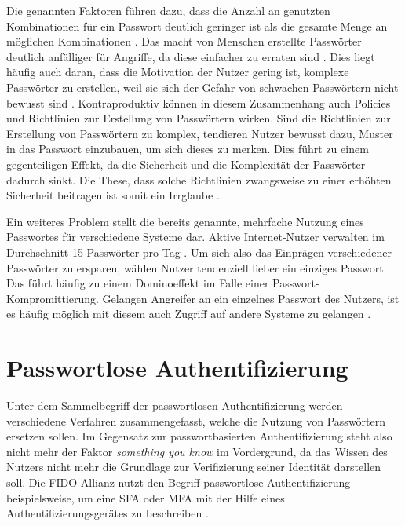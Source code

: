 Die genannten Faktoren führen dazu, dass die Anzahl an genutzten Kombinationen für ein Passwort deutlich geringer ist als die gesamte Menge an möglichen Kombinationen \cite{boonkrong2012security}. Das macht von Menschen erstellte Passwörter deutlich anfälliger für Angriffe, da diese einfacher zu erraten sind \cite{chanda2016password}. Dies liegt häufig auch daran, dass die Motivation der Nutzer gering ist, komplexe Passwörter zu erstellen, weil sie sich der Gefahr von schwachen Passwörtern nicht bewusst sind \cite{yildirim2019encouraging}. Kontraproduktiv können in diesem Zusammenhang auch Policies und Richtlinien zur Erstellung von Passwörtern \cite{yildirim2019encouraging} wirken. Sind die Richtlinien zur Erstellung von Passwörtern zu komplex, tendieren Nutzer bewusst dazu, Muster in das Passwort einzubauen, um sich dieses zu merken. Dies führt zu einem gegenteiligen Effekt, da die Sicherheit und die Komplexität der Passwörter dadurch sinkt. Die These, dass solche Richtlinien zwangsweise zu einer erhöhten Sicherheit beitragen ist somit ein Irrglaube \cite{yildirim2019encouraging} \cite{morii2017research}.

Ein weiteres Problem stellt die bereits genannte, mehrfache Nutzung eines Passwortes für verschiedene Systeme dar. 
Aktive Internet-Nutzer verwalten im Durchschnitt 15 Passwörter pro Tag \cite{ives2004domino}. 
Um sich also das Einprägen verschiedener Passwörter zu ersparen, wählen Nutzer tendenziell lieber ein einziges Passwort. Das führt häufig zu einem Dominoeffekt im Falle einer Passwort-Kompromittierung. 
Gelangen Angreifer an ein einzelnes Passwort des Nutzers, ist es häufig möglich mit diesem auch Zugriff auf andere Systeme zu gelangen \cite{ives2004domino} \cite{morii2017research}. 


\section{Passwortlose Authentifizierung} \label{alts}

Unter dem Sammelbegriff der passwortlosen Authentifizierung werden verschiedene Verfahren zusammengefasst, welche die Nutzung von Passwörtern ersetzen sollen. Im Gegensatz zur passwortbasierten Authentifizierung steht also nicht mehr der Faktor \textit{something you know} im Vordergrund, da das Wissen des Nutzers nicht mehr die Grundlage zur Verifizierung seiner Identität darstellen soll. Die \ac{FIDO} Allianz nutzt den Begriff passwortlose Authentifizierung beispielsweise, um eine \ac{SFA} oder \ac{MFA} mit der Hilfe eines Authentifizierungsgerätes zu beschreiben \cite{farke2020you}. 

